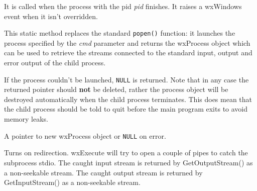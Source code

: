 It is called when the process with the pid {\it pid} finishes.
It raises a wxWindows event when it isn't overridden.



\label{wxprocessopen}


This static method replaces the standard {\tt popen()} function: it launches
the process specified by the {\it cmd} parameter and returns the wxProcess
object which can be used to retrieve the streams connected to the standard
input, output and error output of the child process.

If the process couldn't be launched, {\tt NULL} is returned. Note that in any
case the returned pointer should {\bf not} be deleted, rather the process
object will be destroyed automatically when the child process terminates. This
does mean that the child process should be told to quit before the main program
exits to avoid memory leaks.




A pointer to new wxProcess object or {\tt NULL} on error.



\label{wxprocessredirect}


Turns on redirection. wxExecute will try to open a couple of pipes
to catch the subprocess stdio. The caught input stream is returned by
GetOutputStream() as a non-seekable stream. The caught output stream is returned
by GetInputStream() as a non-seekable stream.

